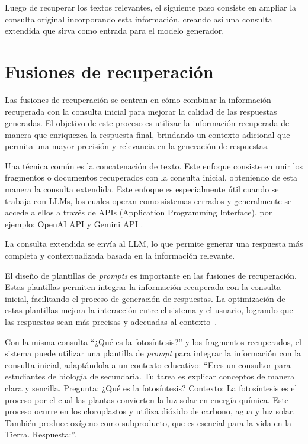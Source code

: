 Luego de recuperar los textos relevantes, el siguiente paso consiste en ampliar la consulta original incorporando esta información, creando así una consulta extendida que sirva como entrada para el modelo generador.

\section{Fusiones de recuperación}

Las fusiones de recuperación se centran en cómo combinar la información recuperada con la consulta inicial para mejorar la calidad de las respuestas generadas. El objetivo de este proceso es utilizar la información recuperada de manera que enriquezca la respuesta final, brindando un contexto adicional que permita una mayor precisión y relevancia en la generación de respuestas.

Una técnica común es la concatenación de texto. Este enfoque consiste en unir los fragmentos o documentos recuperados con la consulta inicial, obteniendo de esta manera la consulta extendida. Este enfoque es especialmente útil cuando se trabaja con LLMs, los cuales operan como sistemas cerrados y generalmente se accede a ellos a través de APIs (Application Programming Interface), por ejemplo: OpenAI API \cite{openai_api} y Gemini API \cite{gemini_model}.

La consulta extendida se envía al LLM, lo que permite generar una respuesta más completa y contextualizada basada en la información relevante.

El diseño de plantillas de \textit{prompts} es importante en las fusiones de recuperación. Estas plantillas permiten integrar la información recuperada con la consulta inicial, facilitando el proceso de generación de respuestas. La optimización de estas plantillas mejora la interacción entre el sistema y el usuario, logrando que las respuestas sean más precisas y adecuadas al contexto~\cite{sahoo2024systematicsurveypromptengineering}.

Con la misma consulta ``¿Qué es la fotosíntesis?'' y los fragmentos recuperados, el sistema puede utilizar una plantilla de \textit{prompt} para integrar la información con la consulta inicial, adaptándola a un contexto educativo:
``Eres un consultor para estudiantes de biología de secundaria. Tu tarea es explicar conceptos de manera clara y sencilla. Pregunta: ¿Qué es la fotosíntesis? Contexto: La fotosíntesis es el proceso por el cual las plantas convierten la luz solar en energía química. Este proceso ocurre en los cloroplastos y utiliza dióxido de carbono, agua y luz solar. También produce oxígeno como subproducto, que es esencial para la vida en la Tierra. Respuesta:''.

